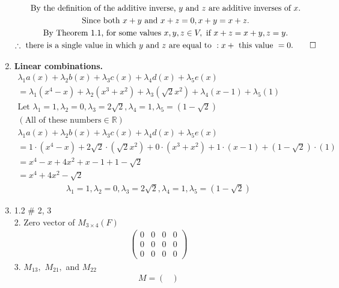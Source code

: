 \documentclass{article}
\begin{document}
\begin{enumerate}
\begin{gather*}
        \textrm{By the definition of the additive inverse, $y$ and $z$ are additive inverses of } x. \\
        \textrm{Since both } x+y \textrm{ and } x+z = 0, x+y=x+z. \\
        \textrm{By Theorem 1.1, for some values } x,y,z \in V, \textrm{ if } x+z=x+y, z=y. \\
        \therefore \textrm{ there is a single value in which $y$ and $z$ are equal to } : x+ \textrm{ this value } = 0. \qed
    \end{gather*}
    \item \textbf{Linear combinations.}
    \begin{gather*}
        \lambda_1 a(x) + \lambda_2 b(x) + \lambda_3 c(x) + \lambda_4 d(x) + \lambda_5 e(x) \\
        = \lambda_1 (x^4 - x) + \lambda_2 (x^3 + x^2) + \lambda_3 (\sqrt{2}x^2) + \lambda_4 (x-1) + \lambda_5 (1) \\
        \textrm{Let } \lambda_1 = 1, \lambda_2 = 0, \lambda_3 = 2\sqrt{2}, \lambda_4 = 1, \lambda_5 = (1-\sqrt{2}) \\
        (\textrm{All of these numbers} \in \mathbb{R}) \\
        \lambda_1 a(x) + \lambda_2 b(x) + \lambda_3 c(x) + \lambda_4 d(x) + \lambda_5 e(x) \\
        = 1\cdot(x^4-x) + 2\sqrt{2}\cdot(\sqrt{2}x^2) + 0\cdot(x^3+x^2) + 1\cdot(x-1) + (1-\sqrt{2})\cdot(1) \\
        = x^4 - x + 4x^2 + x - 1 + 1 - \sqrt{2} \\
        = x^4 + 4x^2 - \sqrt{2}
    \end{gather*}
    \begin{gather*}
        \lambda_1 = 1, \lambda_2 = 0, \lambda_3 = 2\sqrt{2}, \lambda_4 = 1, \lambda_5 = (1-\sqrt{2})
    \end{gather*}
    \item 1.2 \# 2, 3 \\
    2. Zero vector of $M_{3\times 4}(F)$
    \begin{gather*}
        \begin{pmatrix}
            0 & 0 & 0 & 0 \\
            0 & 0 & 0 & 0 \\
            0 & 0 & 0 & 0
        \end{pmatrix}  
    \end{gather*}
    3. $M_{13},$ $M_{21},$ and $M_{22}$
    \begin{gather*}
        M = \begin{pmatrix}

\end{pmatrix}
\end{gather*}
\end{enumerate}
\end{document}
